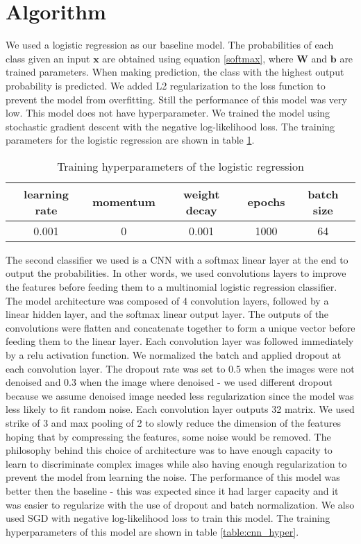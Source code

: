 \documentclass[12pt,english]{article}
\begin{document}
\section{Algorithm}
We used a logistic regression as our baseline model. The probabilities of each class given an input $\bm{x}$ are obtained using equation \ref{softmax}, where $\mathbf{W}$ and $\mathbf{b}$ are trained parameters. When making prediction, the class with the highest output probability is predicted. We added L2 regularization to the loss function to prevent the model from overfitting. Still the performance of this model was very low. This model does not have hyperparameter. We trained the model using stochastic gradient descent with the negative log-likelihood loss. The training parameters for the logistic regression are shown in table \ref{table:lr_hyper}.\\
\begin{table}[h!]
	\centering
	\begin{tabular}{|c|c|c|c|c|}
		\hline 
		learning rate & momentum & weight decay & epochs & batch size \\ 
		\hline 
		0.001 & 0 & 0.001 & 1000 & 64\\ 
		\hline 
	\end{tabular} 
	\caption{Training hyperparameters of the logistic regression}
	\label{table:lr_hyper}
\end{table}

The second classifier we used is a CNN with a softmax linear layer at the end to output the probabilities. In other words, we used convolutions layers to improve the features before feeding them to a multinomial logistic regression classifier.  The model architecture was composed of 4 convolution layers, followed by a linear hidden layer, and the softmax linear output layer. The outputs of the convolutions were flatten and concatenate together to form a unique vector before feeding them to the linear layer. Each convolution layer was followed immediately by a relu activation function. We normalized the batch and applied dropout at each convolution layer. The dropout rate was set to 0.5 when the images were not denoised and 0.3 when the image where denoised - we used different dropout because we assume denoised image needed less regularization since the model was less likely to fit random noise. Each convolution layer outputs 32 matrix. We used strike of 3 and max pooling of 2 to slowly reduce the dimension of the features hoping that by compressing the features, some noise would be removed. The philosophy behind this choice of architecture was to have enough capacity to learn to discriminate complex images while also having enough regularization to prevent the model from learning the noise. The performance of this model was better then the baseline - this was expected since it had larger capacity and it was easier to regularize with the use of dropout and batch normalization. We also used SGD with negative log-likelihood loss to train this model. The training hyperparameters of this model are shown in table \ref{table:cnn_hyper}.
\end{document}
